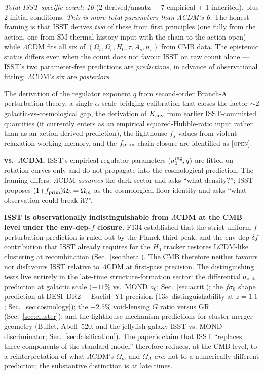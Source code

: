 \documentclass[aps,prd,twocolumn,nofootinbib,floatfix,superscriptaddress]{revtex4-2}
\newcommand{\OPEN}{{\color{black!60!red}\textsc{[open]}}}
\newcommand{\fprim}{f_{\rm prim}}
\begin{document}
\emph{Total ISST-specific count: 10} (2 derived/ansatz + 7 empirical
+ 1 inherited), plus 2 initial conditions. \emph{This is more total
parameters than $\Lambda$CDM's 6.} The honest framing is that ISST
derives \emph{two} of these from first principles (one fully from
the action, one from SM thermal-history input with the chain to the
action open) while $\Lambda$CDM fits all six of
$(\Omega_b, \Omega_c, H_0, \tau, A_s, n_s)$ from CMB data. The
epistemic status differs even when the count does not favour ISST
on raw count alone --- ISST's two parameter-free predictions are
\emph{predictions}, in advance of observational fitting; $\Lambda$CDM's
six are \emph{posteriors}.

The derivation of the regulator exponent $q$ from second-order
Branch-A perturbation theory, a single-$\alpha$ scale-bridging
calibration that closes the factor-$\sim 2$ galactic-vs-cosmological
gap, the derivation of $K_{\rm env}$ from earlier ISST-committed
quantities (it currently enters as an empirical squared-Hubble-ratio
input rather than as an action-derived prediction), the lighthouse
$f_s$ values from violent-relaxation working memory, and the
$\fprim$ chain closure are identified as \OPEN.

\textbf{vs.\ $\Lambda$CDM.} ISST's empirical regulator parameters
$(a_0^{\rm reg}, q)$ are fitted on rotation curves only and do not
propagate into the cosmological prediction. The framing differs:
$\Lambda$CDM \emph{assumes} the dark sector and asks ``what
density?''; ISST proposes $(1{+}\fprim)\Omega_b = \Omega_m$ as the
cosmological-floor identity and asks ``what observation could break
it?''.

\textbf{ISST is observationally indistinguishable from
$\Lambda$CDM at the CMB level under the env-dep-$f$ closure.} F134
established that the strict uniform-$f$ perturbation prediction is
ruled out by the Planck third peak, and the env-dep-$\delta f$
contribution that ISST already requires for the $H_0$ tracker
restores LCDM-like clustering at recombination
(Sec.~\ref{sec:theta}). The CMB therefore neither favours nor
disfavours ISST relative to $\Lambda$CDM at first-pass precision.
The distinguishing tests live entirely in the late-time
structure-formation sector: the differential $a_{\rm crit}$
prediction at galactic scale ($-11\%$ vs.\ MOND $a_0$;
Sec.~\ref{sec:acrit}); the $f\sigma_8$ shape prediction at DESI~DR2
+ Euclid~Y1 precision ($13\sigma$ distinguishability at $z=1.1$;
Sec.~\ref{sec:cosmology}); the $+2.5\%$ void-lensing $G$ ratio
versus GR (Sec.~\ref{sec:cluster}); and the lighthouse-mechanism
predictions for cluster-merger geometry (Bullet, Abell~520, and
the jellyfish-galaxy ISST-vs.-MOND discriminator;
Sec.~\ref{sec:falsification}). The paper's claim that ISST
``replaces three components of the standard model'' therefore
reduces, at the CMB level, to a reinterpretation of what
$\Lambda$CDM's $\Omega_m$ and $\Omega_\Lambda$ \emph{are}, not to
a numerically different prediction; the substantive distinction
is at late times.
\end{document}
